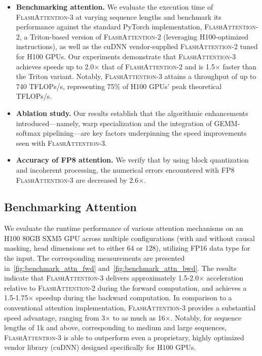 \begin{enumerate}
\begin{itemize}

\item \textbf{Benchmarking attention.} We evaluate the execution time of \textsc{FlashAttention-3} at varying sequence lengths and benchmark its performance against the standard PyTorch implementation, \textsc{FlashAttention-2}, a Triton-based version of \textsc{FlashAttention-2} (leveraging H100-optimized instructions), as well as the cuDNN vendor-supplied \textsc{FlashAttention-2} tuned for H100 GPUs. Our experiments demonstrate that \textsc{FlashAttention-3} achieves speeds up to 2.0$\times$ that of \textsc{FlashAttention-2} and is 1.5$\times$ faster than the Triton variant. Notably, \textsc{FlashAttention-3} attains a throughput of up to 740 TFLOPs/s, representing 75\% of H100 GPUs' peak theoretical TFLOPs/s.
\item \textbf{Ablation study.} Our results establish that the algorithmic enhancements introduced—namely, warp specialization and the integration of GEMM-softmax pipelining—are key factors underpinning the speed improvements seen with \textsc{FlashAttention-3}.
\item \textbf{Accuracy of FP8 attention.} We verify that by using block quantization and incoherent processing, the numerical errors encountered with FP8 \textsc{FlashAttention-3} are decreased by 2.6$\times$.
\end{itemize}

\subsection{Benchmarking Attention}
\label{subsec:benchmark_attn}

We evaluate the runtime performance of various attention mechanisms on an H100 80GB SXM5 GPU across multiple configurations (with and without causal masking, head dimensions set to either 64 or 128), utilizing FP16 data type for the input. The corresponding measurements are presented in~\cref{fig:benchmark_attn_fwd} and~\cref{fig:benchmark_attn_bwd}. The results indicate that \textsc{FlashAttention-3} delivers approximately 1.5-2.0$\times$ acceleration relative to \textsc{FlashAttention-2} during the forward computation, and achieves a 1.5-1.75$\times$ speedup during the backward computation. In comparison to a conventional attention implementation, \textsc{FlashAttention-3} provides a substantial speed advantage, ranging from 3$\times$ to as much as 16$\times$. Notably, for sequence lengths of 1k and above, corresponding to medium and large sequences, \textsc{FlashAttention-3} is able to outperform even a proprietary, highly optimized vendor library (cuDNN) designed specifically for H100 GPUs.


\end{enumerate}
